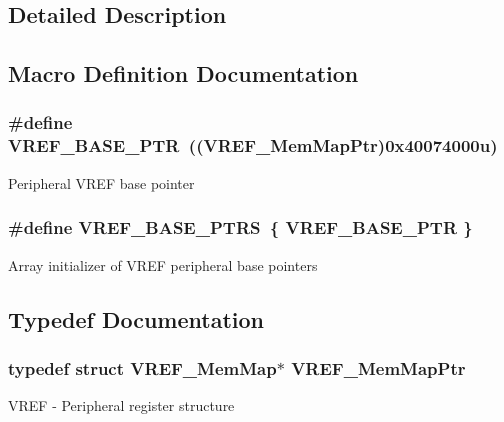 \subsection{Detailed Description}


\subsection{Macro Definition Documentation}
\hypertarget{group___v_r_e_f___peripheral_ga53dba79dbefcdd6f788740a6d0caa57d}{}
\subsubsection[{V\+R\+E\+F\+\_\+\+B\+A\+S\+E\+\_\+\+P\+T\+R}]{\setlength{\rightskip}{0pt plus 5cm}\#define V\+R\+E\+F\+\_\+\+B\+A\+S\+E\+\_\+\+P\+T\+R~(({\bf V\+R\+E\+F\+\_\+\+Mem\+Map\+Ptr})0x40074000u)}\label{group___v_r_e_f___peripheral_ga53dba79dbefcdd6f788740a6d0caa57d}
Peripheral V\+R\+E\+F base pointer \hypertarget{group___v_r_e_f___peripheral_ga3eb17aee5de4a519ee18fe763e43865b}{}
\subsubsection[{V\+R\+E\+F\+\_\+\+B\+A\+S\+E\+\_\+\+P\+T\+R\+S}]{\setlength{\rightskip}{0pt plus 5cm}\#define V\+R\+E\+F\+\_\+\+B\+A\+S\+E\+\_\+\+P\+T\+R\+S~\{ {\bf V\+R\+E\+F\+\_\+\+B\+A\+S\+E\+\_\+\+P\+T\+R} \}}\label{group___v_r_e_f___peripheral_ga3eb17aee5de4a519ee18fe763e43865b}
Array initializer of V\+R\+E\+F peripheral base pointers 

\subsection{Typedef Documentation}
\hypertarget{group___v_r_e_f___peripheral_ga0730b01086e1d40975ad4e6c1d101b7c}{}
\subsubsection[{V\+R\+E\+F\+\_\+\+Mem\+Map\+Ptr}]{\setlength{\rightskip}{0pt plus 5cm}typedef struct {\bf V\+R\+E\+F\+\_\+\+Mem\+Map}$\ast$ {\bf V\+R\+E\+F\+\_\+\+Mem\+Map\+Ptr}}\label{group___v_r_e_f___peripheral_ga0730b01086e1d40975ad4e6c1d101b7c}
V\+R\+E\+F -\/ Peripheral register structure 